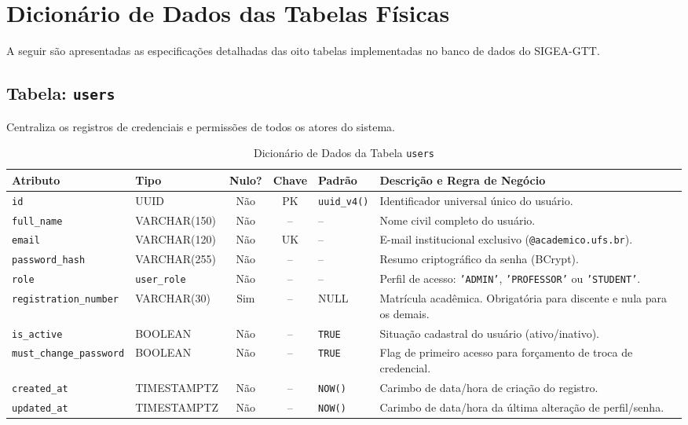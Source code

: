 \section{Dicionário de Dados das Tabelas Físicas}
\label{sec_dicionario_dados}

A seguir são apresentadas as especificações detalhadas das oito tabelas implementadas no banco de dados do SIGEA-GTT.

\subsection{Tabela: \texttt{users}}
Centraliza os registros de credenciais e permissões de todos os atores do sistema.

\begin{table}[!ht]
\centering
\caption{Dicionário de Dados da Tabela \texttt{users}}
\label{tab_dic_users}
\footnotesize
\begin{tabularx}{\textwidth}{p{3.2cm} p{2.5cm} c c p{1.8cm} X}
\toprule
\textbf{Atributo} & \textbf{Tipo} & \textbf{Nulo?} & \textbf{Chave} & \textbf{Padrão} & \textbf{Descrição e Regra de Negócio} \\
\midrule
\texttt{id} & UUID & Não & PK & \texttt{uuid\_v4()} & Identificador universal único do usuário. \\
\texttt{full\_name} & VARCHAR(150) & Não & -- & -- & Nome civil completo do usuário. \\
\texttt{email} & VARCHAR(120) & Não & UK & -- & E-mail institucional exclusivo (\texttt{@academico.ufs.br}). \\
\texttt{password\_hash} & VARCHAR(255) & Não & -- & -- & Resumo criptográfico da senha (BCrypt). \\
\texttt{role} & \texttt{user\_role} & Não & -- & -- & Perfil de acesso: \texttt{'ADMIN'}, \texttt{'PROFESSOR'} ou \texttt{'STUDENT'}. \\
\texttt{registration\_\-number} & VARCHAR(30) & Sim & -- & NULL & Matrícula acadêmica. Obrigatória para discente e nula para os demais. \\
\texttt{is\_active} & BOOLEAN & Não & -- & \texttt{TRUE} & Situação cadastral do usuário (ativo/inativo). \\
\texttt{must\_\-change\_\-password} & BOOLEAN & Não & -- & \texttt{TRUE} & Flag de primeiro acesso para forçamento de troca de credencial. \\
\texttt{created\_at} & TIMESTAMPTZ & Não & -- & \texttt{NOW()} & Carimbo de data/hora de criação do registro. \\
\texttt{updated\_at} & TIMESTAMPTZ & Não & -- & \texttt{NOW()} & Carimbo de data/hora da última alteração de perfil/senha. \\
\bottomrule
\end{tabularx}
\end{table}

